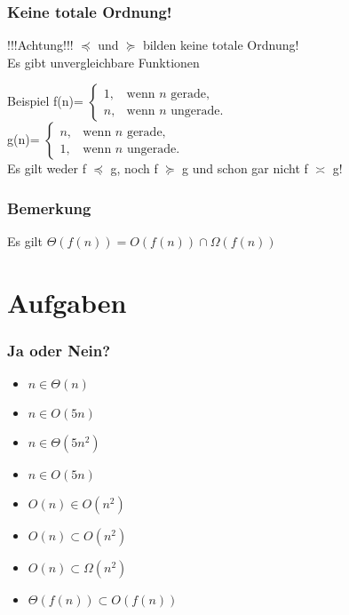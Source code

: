 \documentclass{beamer}
\begin{document}
\begin{frame}
	\frametitle{Keine totale Ordnung!}
	\begin{block}{!!!Achtung!!!}
		$\preceq$ und $\succeq$ bilden keine totale Ordnung! \\
		Es gibt unvergleichbare Funktionen
	\end{block}
	\begin{block}{Beispiel}
		f(n)=
		$\begin{cases}
			1,  & \text{wenn }n\text{ gerade,}\\
 		 	n, & \text{wenn }n\text{ ungerade.}
		\end{cases}$ \\
		g(n)=
		$\begin{cases}
			n,  & \text{wenn }n\text{ gerade,}\\
 		 	1, & \text{wenn }n\text{ ungerade.}
		\end{cases}$ \\
		Es gilt weder f $\preceq$ g, noch f $\succeq$ g und schon gar nicht f $\asymp$ g!
	\end{block}
\end{frame}

\begin{frame}
	\frametitle{Bemerkung}
	\begin{block}{Es gilt}
		$\Theta(f(n)) = O(f(n)) \cap \Omega(f(n))$ 
	\end{block}
\end{frame}

\section{Aufgaben}
\begin{frame}
	\frametitle{Ja oder Nein?}
	\begin{itemize}
		\item $n \in \Theta(n)$ \pause
		\item $n \in O(5n)$\pause
		\item $n \in \Theta(5n^2)$\pause
		\item $n \in O(5n)$\pause
		\item $O(n) \in O(n^2)$\pause
		\item $O(n) \subset O(n^2)$\pause
		\item $O(n) \subset \Omega(n^2)$\pause
		\item $\Theta(f(n)) \subset O(f(n))$
	\end{itemize}
\end{frame}
\end{document}
